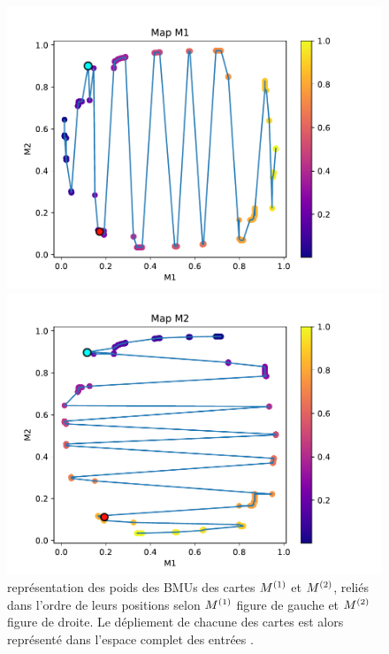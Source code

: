 \begin{figure}
    \begin{minipage}{0.49\textwidth}
    \includegraphics[width=\textwidth]{disto_cercle_M1.pdf}
    \end{minipage}
    \begin{minipage}{0.49\textwidth}
    \includegraphics[width=\textwidth]{disto_cercle_M2.pdf}
    \end{minipage}
    \caption{représentation des poids des BMUs des cartes $M^{({1})}$ et $M^{({2})}$, reliés dans l'ordre de leurs positions selon $M^{({1})}$ figure de gauche et $M^{({2})}$ figure de droite. Le dépliement de chacune des cartes est alors représenté dans l'espace complet des entrées \label{fig:distortion}.}
    \end{figure}

